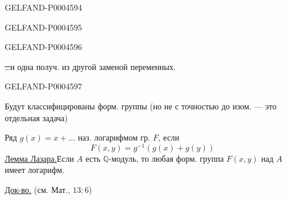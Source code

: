 \begin{GelfandAdjacentEvidence}{GELFAND-P000459}{4}

\end{GelfandAdjacentEvidence}
\begin{GelfandAdjacentEvidence}{GELFAND-P000459}{5}

\end{GelfandAdjacentEvidence}
\begin{GelfandAdjacentEvidence}{GELFAND-P000459}{6}


\sout{\ldots}\quad и одна получ. из другой заменой переменных.
\end{GelfandAdjacentEvidence}
\begin{GelfandAdjacentEvidence}{GELFAND-P000459}{7}


Будут классифицированы форм. группы (но не с точностью до изом. — это отдельная задача)

Ряд $g(x)=x+\ldots$ наз. логарифмом гр. $F$, если
\[
F(x,y)=g^{-1}(g(x)+g(y))
\]
\underline{Лемма Лазара.}\quad Если $A$ есть $\mathbb Q$-модуль,
то любая форм. группа $F(x,y)$ над $A$ имеет логарифм.
\end{GelfandAdjacentEvidence}


\underline{Док-во.} (см. Мат., $13:6$)


